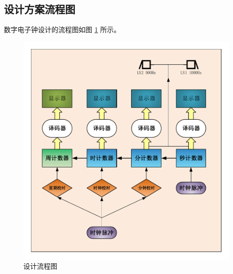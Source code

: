 \subsection{设计方案流程图}

数字电子钟设计的流程图如图 \ref{fig:FlowChart} 所示。


\begin{figure}[hbtp]
	\centering
	\includegraphics[width=16cm]{figure/FlowChart}
	\caption{设计流程图}\label{fig:FlowChart}
\end{figure}